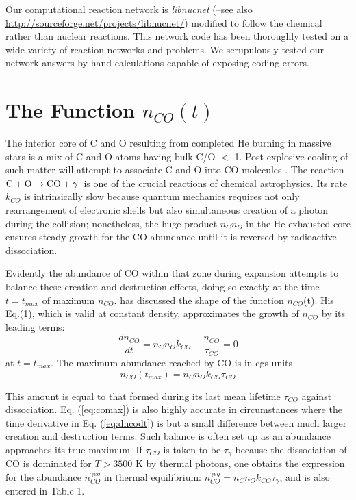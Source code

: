 \documentclass[manuscript]{aastex}
\newcommand{\cotoco}{${\rm C} + {\rm O} \to {\rm CO} + \gamma$}
\begin{document}
\begin{CJK*}{UTF8}{gbsn}
Our computational reaction network is {\em libnucnet}
(\citealp{2007M&PSA..42.5215M}--see also
\url{http://sourceforge.net/projects/libnucnet/}) modified to follow
the chemical rather than nuclear reactions.
This network code has been thoroughly tested
on a wide variety of reaction networks and problems.
We scrupulously tested our network answers by hand calculations capable of
exposing coding errors.

\section{The Function $n_{CO}(t)$}

The interior core of C and O resulting from completed He burning in massive
stars is a mix of C and O atoms having bulk C/O $<$ 1. Post explosive cooling of
such matter will attempt to associate C and O into CO molecules 
\citep{1990ApJ...358..262L}.
The reaction \cotoco\ is one of the crucial reactions of chemical
astrophysics. Its rate $k_{CO}$ is intrinsically slow because quantum mechanics
requires not only rearrangement of electronic shells but also simultaneous
creation of a photon during the collision; nonetheless, the huge product
$n_C n_O$ in the He-exhausted core ensures steady growth for the CO abundance
until it is reversed by radioactive dissociation. 

Evidently the abundance of CO within that zone during expansion attempts to
balance these creation and destruction effects, doing so exactly at the
time $t = t_{max}$ of maximum $n_{CO}$. \citet{2013ApJ...762....5C}
has discussed the shape of the function
$n_{CO}$(t). His Eq.(1), which is valid at constant density,
approximates the growth of $n_{CO}$ by its leading terms:
\begin{equation}
\frac{dn_{CO}}{dt} = n_C n_O k_{CO} - \frac{n_{CO}}{\tau_{CO}} = 0
\label{eq:dncodt}
\end{equation}
at $t = t_{max}$.
The maximum abundance reached by CO is in cgs units
\begin{equation}
n_{CO}(t_{max}) = n_C n_O k_{CO} \tau_{CO} 
\label{eq:comax}
\end{equation}

This amount is equal to that formed during its last mean lifetime $\tau_{CO}$
against dissociation. Eq. (\ref{eq:comax}) is also highly accurate in
circumstances where the time derivative in Eq. (\ref{eq:dncodt}) is but a
small difference between much larger creation and destruction terms. Such
balance is often set up as an abundance approaches its true maximum. 
If $\tau_{CO}$ is taken to be $\tau_\gamma$ because
the dissociation of CO is dominated for $T > 3500$ K by thermal photons,
one obtains the expression for the abundance $n_{CO}^{\gamma eq}$ in thermal
equilibrium: $n_{CO}^{\gamma eq} = n_C n_O k_{CO} \tau_\gamma$,
and is also entered in Table 1. 


\end{CJK*}
\end{document}

